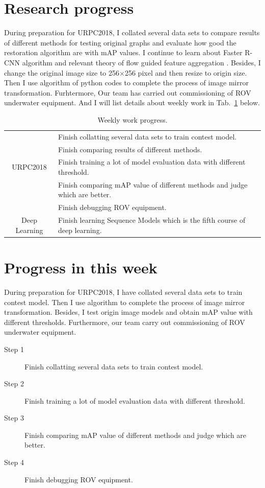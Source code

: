 \documentclass[a4paper]{article}
\begin{document}
	
	\section{Research progress}
	
	During preparation for URPC2018, I collated several data sets to compare results of different methods for testing original graphs and evaluate how good the restoration algorithm are with mAP values. I continue to learn about Faster R-CNN algorithm \cite{Ren2015Faster} and relevant theory of flow guided feature aggregation \cite{zhu17fgfa}. Besides, I change the original image size to 256$\times$256 pixel and then resize to origin size. Then I use algorithm of python codes to complete the process of image mirror transformation. Furhtermore, Our team has carried out commissioning of ROV underwater equipment. And I will list details about weekly work in Tab.~\ref{t1} below.
	
	\begin{table}[hb]
		\centering
		\caption{Weekly work progress.}
		\begin{tabular}{c|p{10cm}}
			\hline 
			& Finish collatting several data sets to train contest model.\\
			
			& Finish comparing results of different methods. \\
			
			URPC2018 & Finish training a lot of model evaluation data with different threshold.\\
			
			& Finish comparing mAP value of different methods and judge which are better.\\
			
			& Finish debugging ROV equipment.\\
			\hline
			Deep Learning& Finish learning Sequence Models which is the fifth course of deep learning.\\
			\hline
		\end{tabular}
		\label{t1}
	\end{table} 
	
	\section{Progress in this week}
	
	During preparation for URPC2018, I have collated several data sets to train contest model. Then I use algorithm to complete the process of image mirror transformation. Besides, I test origin image models and obtain mAP value with different thresholds. Furthermore, our team carry out commissioning of ROV underwater equipment.  
	\begin{description}
		\item[Step 1] Finish collatting several data sets to train contest model.
		\item[Step 2] Finish training a lot of model evaluation data with different threshold.
		\item[Step 3] Finish comparing mAP value of different methods and judge which are better.
		\item[Step 4] Finish debugging ROV equipment.\label{t2}
	\end{description}
	
\end{document}
